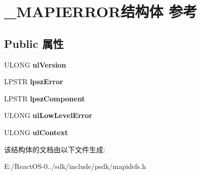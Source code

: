 \hypertarget{struct___m_a_p_i_e_r_r_o_r}{}\section{\+\_\+\+M\+A\+P\+I\+E\+R\+R\+O\+R结构体 参考}
\label{struct___m_a_p_i_e_r_r_o_r}
\subsection*{Public 属性}
\begin{DoxyCompactItemize}
\item 
\mbox{\label{struct___m_a_p_i_e_r_r_o_r_a5842452d58d109586bedbdcec53af65c}} 
U\+L\+O\+NG {\bfseries ul\+Version}
\item 
\mbox{\label{struct___m_a_p_i_e_r_r_o_r_ad92d2b11da90f5a9bf5074bcd798dc4e}} 
L\+P\+S\+TR {\bfseries lpsz\+Error}
\item 
\mbox{\label{struct___m_a_p_i_e_r_r_o_r_a4ac90a389e3ac0f5ca987f91e6cce349}} 
L\+P\+S\+TR {\bfseries lpsz\+Component}
\item 
\mbox{\label{struct___m_a_p_i_e_r_r_o_r_ab7c542d843805f6ad343002310ab0da9}} 
U\+L\+O\+NG {\bfseries ul\+Low\+Level\+Error}
\item 
\mbox{\label{struct___m_a_p_i_e_r_r_o_r_ac03b7763852a8fa4695e6ffddc0a02ac}} 
U\+L\+O\+NG {\bfseries ul\+Context}
\end{DoxyCompactItemize}


该结构体的文档由以下文件生成\+:\begin{DoxyCompactItemize}
\item 
E\+:/\+React\+O\+S-\/0../sdk/include/psdk/mapidefs.\+h\end{DoxyCompactItemize}

